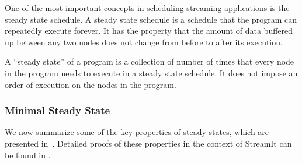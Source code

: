 \documentclass{sig-alt-full}
\newtheorem{definition}{Definition}
\begin{document}
One of the most important concepts in scheduling streaming
applications is the steady state schedule.  A steady state schedule is
a schedule that the program can repeatedly execute forever.  It has
the property that the amount of data buffered up between any two nodes
does not change from before to after its execution.

A ``steady state'' of a program is a collection of number of times
that every node in the program needs to execute in a steady state
schedule.  It does not impose an order of execution on the nodes in
the program.
\begin{comment}
Not every {\StreamIt} program has a steady state schedule.  It is
possible for a program to have unbalanced production and
consumption of data in {\splitjoins} and {\feedbackloops}. The
amount of data buffered continually increases, and cannot be
reduced, thus making it impossible to create a steady state
schedule for them.  It is also possible that a {\feedbackloop}
does not have enough data buffered up internally in order to
complete execution of a full steady state, and thus deadlocks.
Programs without a valid steady state schedule are not considered
valid {\StreamIt} programs. In other words, all valid {\StreamIt}
programs have a steady state schedule.
\end{comment}

\subsubsection{Minimal Steady State}

We now summarize some of the key properties of steady states, which
are presented in~\cite{lee87static}.  Detailed proofs of these
properties in the context of StreamIt can be found in
\cite{karczma-thesis}.



\end{document}
